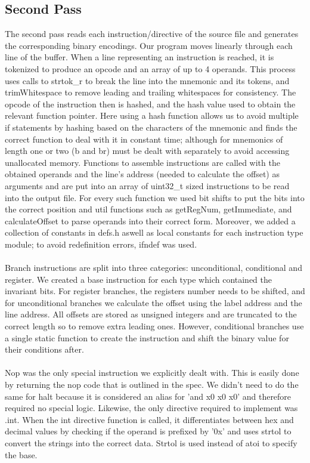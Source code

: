 \documentclass[11pt]{article}
\begin{document}
\subsection{Second Pass}
The second pass reads each instruction/directive of the source file and generates the corresponding binary encodings. Our program moves linearly through each line of the buffer. When a line representing an instruction is reached, it is tokenized to produce an opcode and an array of up to 4 operands. This process uses calls to strtok\_r to break the line into the mnemonic and its tokens, and trimWhitespace to remove leading and trailing whitespaces for consistency. The opcode of the instruction then is hashed, and the hash value used to obtain the relevant function pointer. Here using a hash function allows us to avoid multiple if statements by hashing based on the characters of the mnemonic and finds the correct function to deal with it in constant time; although for mnemonics of length one or two (b and br) must be dealt with separately to avoid accessing unallocated memory. Functions to assemble instructions are called with the obtained operands and the line's address (needed to calculate the offset) as arguments and are put into an array of uint32\_t sized instructions to be read into the output file. For every such function we used bit shifts to put the bits into the correct position and util functions such as getRegNum, getImmediate, and calculateOffset to parse operands into their correct form. Moreover, we added a collection of constants in defs.h aswell as local constants for each instruction type module; to avoid redefinition errors, ifndef was used. \\\\
Branch instructions are split into three categories: unconditional, conditional and register. We created a base instruction for each type which contained the invariant bits. For register branches, the registers number needs to be shifted, and for unconditional branches we calculate the offset using the label address and the line address. All offsets are stored as unsigned integers and are truncated to the correct length so to remove extra leading ones. However, conditional branches use a single static function to create the instruction and shift the binary value for their conditions after. \\\\
Nop was the only special instruction we explicitly dealt with. This is easily done by returning the nop code that is outlined in the spec. We didn't need to do the same for halt because it is considered an alias for 'and x0 x0 x0' and therefore required no special logic. Likewise, the only directive required to implement was .int. When the int directive function is called, it differentiates between hex and decimal values by checking if the operand is prefixed by '0x' and uses strtol to convert the strings into the correct data. Strtol is used instead of atoi to specify the base. \\\\
\end{document}
